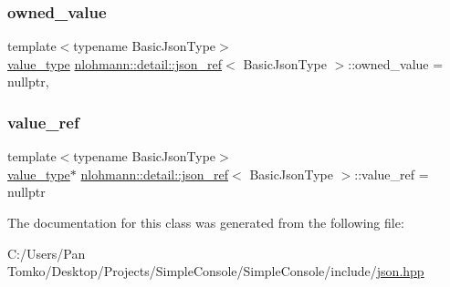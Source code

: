 \subsubsection{\texorpdfstring{owned\_value}{owned\_value}}
{\footnotesize\ttfamily template$<$typename Basic\+Json\+Type$>$ \\
\mbox{\hyperlink{classnlohmann_1_1detail_1_1json__ref_a78d76cf288141049568c0d670ed670ef}{value\+\_\+type}} \mbox{\hyperlink{classnlohmann_1_1detail_1_1json__ref}{nlohmann\+::detail\+::json\+\_\+ref}}$<$ Basic\+Json\+Type $>$\+::owned\+\_\+value = nullptr\hspace{0.3cm}{\ttfamily [mutable]}, {\ttfamily [private]}}

\mbox{\label{classnlohmann_1_1detail_1_1json__ref_a23504615c2076070d5e087443bb376a4}} 
\subsubsection{\texorpdfstring{value\_ref}{value\_ref}}
{\footnotesize\ttfamily template$<$typename Basic\+Json\+Type$>$ \\
\mbox{\hyperlink{classnlohmann_1_1detail_1_1json__ref_a78d76cf288141049568c0d670ed670ef}{value\+\_\+type}}$\ast$ \mbox{\hyperlink{classnlohmann_1_1detail_1_1json__ref}{nlohmann\+::detail\+::json\+\_\+ref}}$<$ Basic\+Json\+Type $>$\+::value\+\_\+ref = nullptr\hspace{0.3cm}{\ttfamily [private]}}



The documentation for this class was generated from the following file\+:\begin{DoxyCompactItemize}
\item 
C\+:/\+Users/\+Pan Tomko/\+Desktop/\+Projects/\+Simple\+Console/\+Simple\+Console/include/\mbox{\hyperlink{json_8hpp}{json.\+hpp}}\end{DoxyCompactItemize}
